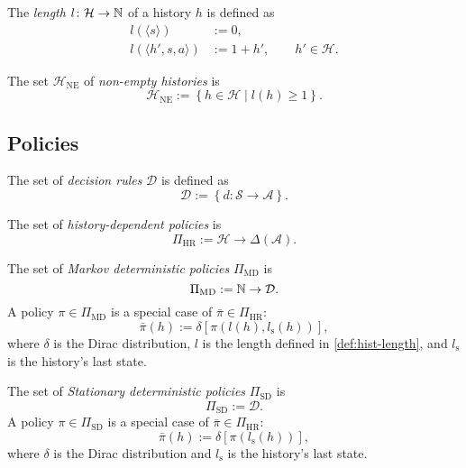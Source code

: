 \begin{definition} \label{def:hist-length}
The \emph{length} $l\colon \mathcal{H} \to \mathbb{N}$ of a history $h$ is defined as
\begin{align*}
l(\langle s \rangle) &:= 0, \\
l(\langle h', s, a \rangle) &:= 1 + h', \qquad h' \in \mathcal{H}. 
\end{align*}
\end{definition}

\begin{definition} \label{def:hist-ne}
The set $\mathcal{H}_{\mathrm{NE}}$ of \emph{non-empty histories} is
\[
\mathcal{H}_{\mathrm{NE}} := \left\{ h \in \mathcal{H} \mid  l(h) \ge 1 \right\}.
\]
 \leanok
\end{definition}

\subsection{Policies}

\begin{definition} \label{def:decision-rule}
The set of \emph{decision rules} $\mathcal{D}$ is defined as
\[
\mathcal{D} := \left\{ d \colon \mathcal{S} \to \mathcal{A} \right\}.
\]
\leanok
\end{definition}

\begin{definition} \label{def:policy-hr}
The set of \emph{history-dependent policies} is
\[
\Pi_{\mathrm{HR}} := \mathcal{H} \to \Delta(\mathcal{A}).
\]
 \leanok
\end{definition}


\begin{definition} \label{def:policy-md}
The set of \emph{Markov deterministic policies} $\Pi_{\mathrm{MD}}$ is
\[
\Pi_{\mathrm{MD}} :=  \mathbb{N} \to \mathcal{D}.
\]
A policy $\pi \in \Pi_{\mathrm{MD}}$ is a special case of $\bar{\pi} \in \Pi_{\mathrm{HR}}$:
\[
  \bar{\pi}(h) := \delta \left[  \pi(l(h), l_{\mathrm{s}}(h)) \right],
\]
where $\delta$ is the Dirac distribution, $l$ is the length defined in \cref{def:hist-length}, and $l_{\mathrm{s}}$ is the history's last state.
\leanok
\end{definition}

\begin{definition} \label{def:policy-sd}
The set of \emph{Stationary deterministic policies} $\Pi_{\mathrm{SD}}$ is 
\[
\Pi_{\mathrm{SD}} := \mathcal{D}.
\]
A policy $\pi \in \Pi_{\mathrm{SD}}$ is a special case of $\bar{\pi} \in \Pi_{\mathrm{HR}}$:
\[
  \bar{\pi}(h) := \delta \left[  \pi(l_{\mathrm{s}}(h)) \right],
\]
where $\delta$ is the Dirac distribution and $l_{\mathrm{s}}$ is the history's last state.
\leanok
\end{definition}

